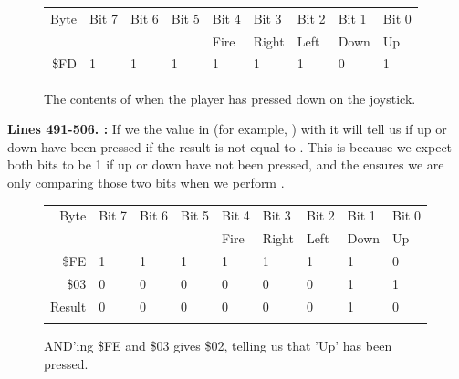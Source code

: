 \begin{figure}[H]
  {
    \setlength{\tabcolsep}{3.0pt}
    \setlength\cmidrulewidth{\heavyrulewidth} %
    \begin{adjustbox}{width=7cm,center}

      \begin{tabular}{rllllllll}
        \toprule
        Byte & Bit 7 & Bit 6 & Bit 5 & Bit 4 & Bit 3 & Bit 2 & Bit 1 & Bit 0        \\
             &       &       &       & Fire  & Right & Left  & Down  & Up           \\
        \midrule
        \$FD & 1 & 1 & 1 & 1 & 1 & 1 & 0 & 1 \\
        \bottomrule
      \end{tabular}
    \end{adjustbox}
  }\caption*{The contents of  when the player has pressed down on the joystick.}
\end{figure}

\textbf{Lines 491-506. :} If we  the value in  (for
example, ) with
 it will tell us if up or down have been pressed if the result is not equal to . This is because
we expect both bits to be 1 if up or down have not been pressed, and the  ensures we are only comparing those
two bits when we perform .
\begin{figure}[H]
  {
    \setlength{\tabcolsep}{3.0pt}
    \setlength\cmidrulewidth{\heavyrulewidth} %
    \begin{adjustbox}{width=7cm,center}

      \begin{tabular}{rllllllll}
        \toprule
        Byte & Bit 7 & Bit 6 & Bit 5 & Bit 4 & Bit 3 & Bit 2 & Bit 1 & Bit 0        \\
             &       &       &       & Fire  & Right & Left  & Down  & Up           \\
        \midrule
        \$FE & 1 & 1 & 1 & 1 & 1 & 1 & 1 & 0 \\
        \$03 & 0 & 0 & 0 & 0 & 0 & 0 & 1 & 1 \\
        \midrule
        Result & 0 & 0 & 0 & 0 & 0 & 0 & 1 & 0 \\
        \addlinespace
        \bottomrule
      \end{tabular}
    \end{adjustbox}
    }\caption*{AND'ing \$FE and \$03 gives \$02, telling us that 'Up' has been pressed.}
\end{figure}

